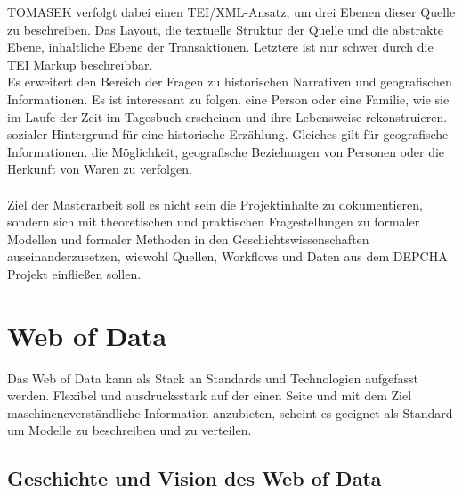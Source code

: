 \documentclass[12pt,a4paper]{article}
\begin{document}
TOMASEK verfolgt dabei einen TEI/XML-Ansatz, um drei Ebenen dieser Quelle zu beschreiben. Das Layout, die textuelle Struktur der Quelle und die abstrakte Ebene, inhaltliche Ebene der Transaktionen. Letztere ist nur schwer durch die TEI Markup beschreibbar.
\\
Es erweitert den Bereich der Fragen zu historischen Narrativen und geografischen Informationen. Es ist interessant zu folgen.
eine Person oder eine Familie, wie sie im Laufe der Zeit im Tagesbuch erscheinen und ihre Lebensweise rekonstruieren. 
sozialer Hintergrund für eine historische Erzählung. Gleiches gilt für geografische Informationen.
die Möglichkeit, geografische Beziehungen von Personen oder die Herkunft von Waren zu verfolgen.
\\
\\
Ziel der Masterarbeit soll es nicht sein die Projektinhalte zu dokumentieren, sondern sich mit theoretischen und praktischen Fragestellungen zu formaler Modellen und formaler Methoden in den Geschichtswissenschaften  auseinanderzusetzen, wiewohl Quellen, Workflows und Daten aus dem DEPCHA Projekt einfließen sollen.


\section{Web of Data}
\label{WebofData}
Das Web of Data kann als Stack an Standards und Technologien aufgefasst werden. Flexibel und ausdrucksstark auf der einen Seite und mit dem Ziel maschineneverständliche Information anzubieten, scheint es geeignet als Standard um Modelle zu beschreiben und zu verteilen.

\subsection{Geschichte und Vision des Web of Data}
\end{document}
